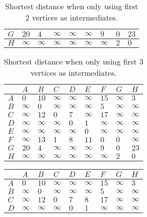 \begin{solution}
\begin{table}[H]
\begin{tabular}{|l|l|l|l|l|l|l|l|l|}
$G$    & $20$ & $4$ & $\infty$ & $\infty$ & $\infty$ & $9$ & $0$ & $23$ \\ \hline
$H$    & $\infty$ & $\infty$ & $\infty$ & $\infty$ & $\infty$ & $\infty$ & $2$ & $0$ \\ \hline
\end{tabular}
\caption{Shortest distance when only using first $2$ vertices as intermediates.}
\end{table}
\begin{table}[H]
    \centering
\begin{tabular}{|l|l|l|l|l|l|l|l|l|}
\hline
 & $A$ & $B$ & $C$ & $D$ & $E$ & $F$ & $G$ & $H$ \\ \hline
$A$ & $0$ & $10$ & $\infty$ & $\infty$ & $\infty$ & $15$ & $\infty$ & $3$ \\ \hline
$B$    & $\infty$ & $0$ & $\infty$ & $\infty$ & $\infty$ & $5$ & $\infty$ & $\infty$ \\ \hline
$C$    & $\infty$ & $12$ & $0$ & $7$ & $\infty$ & $17$ & $\infty$ & $\infty$ \\ \hline
$D$    & $\infty$ & $\infty$ & $\infty$ & $0$ & $1$ & $\infty$ & $\infty$ & $\infty$ \\ \hline
$E$    & $\infty$ & $\infty$ & $\infty$ & $\infty$ & $0$ & $\infty$ & $\infty$ & $\infty$ \\ \hline
$F$    & $\infty$ & $13$ & $1$ & $8$ & $11$ & $0$ & $0$ & $\infty$ \\ \hline
$G$    & $20$ & $4$ & $\infty$ & $\infty$ & $\infty$ & $9$ & $0$ & $23$ \\ \hline
$H$    & $\infty$ & $\infty$ & $\infty$ & $\infty$ & $\infty$ & $\infty$ & $2$ & $0$ \\ \hline
\end{tabular}
\caption{Shortest distance when only using first $3$ vertices as intermediates.}
\end{table}
\begin{table}[H]
    \centering
\begin{tabular}{|l|l|l|l|l|l|l|l|l|}
\hline
 & $A$ & $B$ & $C$ & $D$ & $E$ & $F$ & $G$ & $H$ \\ \hline
$A$ & $0$ & $10$ & $\infty$ & $\infty$ & $\infty$ & $15$ & $\infty$ & $3$ \\ \hline
$B$    & $\infty$ & $0$ & $\infty$ & $\infty$ & $\infty$ & $5$ & $\infty$ & $\infty$ \\ \hline
$C$    & $\infty$ & $12$ & $0$ & $7$ & $8$ & $17$ & $\infty$ & $\infty$ \\ \hline
$D$    & $\infty$ & $\infty$ & $\infty$ & $0$ & $1$ & $\infty$ & $\infty$ & $\infty$ \\ \hline

\end{tabular}
\end{table}
\end{solution}
